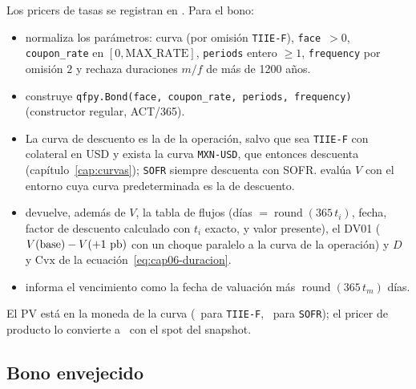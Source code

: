 Los pricers de tasas se registran en . Para el bono:
\begin{itemize}
  \item {} normaliza los parámetros: curva (por omisión
        \texttt{TIIE-F}), \texttt{face}~$>0$, \texttt{coupon\_rate} en $[0,\text{MAX\_RATE}]$, \texttt{periods}
        entero $\ge1$, \texttt{frequency} por omisión $2$ y rechaza duraciones $m/f$ de más de 1200 años.
  \item {} construye
        \texttt{qfpy.Bond(face, coupon\_rate, periods, frequency)} (constructor regular, ACT/365).
  \item La curva de descuento es la de la operación, salvo que sea \texttt{TIIE-F} con colateral en USD y
        exista la curva \texttt{MXN-USD}, que entonces descuenta (capítulo~\ref{cap:curvas}); \texttt{SOFR}
        siempre descuenta con SOFR.  evalúa
        $V$ con el entorno cuya curva predeterminada es la de descuento.
  \item {} devuelve, además de $V$, la tabla de flujos (días
        $=\operatorname{round}(365\,t_i)$, fecha, factor de descuento calculado con $t_i$ exacto, y valor
        presente), el DV01 ($V(\text{base})-V(+1~\textup{pb})$ con un choque paralelo a la curva de la operación) y
        $D$ y $\mathrm{Cvx}$ de la ecuación~\eqref{eq:cap06-duracion}.
  \item {} informa el vencimiento como la fecha de valuación más
        $\operatorname{round}(365\,t_m)$ días.
\end{itemize}
El PV está en la moneda de la curva (\MXN\ para \texttt{TIIE-F}, \USD\ para \texttt{SOFR}); el pricer de
producto lo convierte a \MXN\ con el spot del snapshot.

\subsection{Bono envejecido}\label{sec:cap06-envejecimiento}

